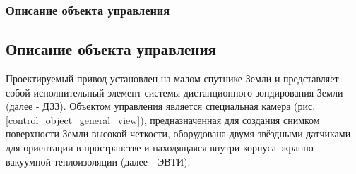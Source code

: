 \ifdefined\DIPLOMA
    \subsubsection{Описание объекта управления}
    \label{sec_controlled_object_desc}
\else
    \subsection{Описание объекта управления}
\fi

Проектируемый привод установлен на малом спутнике Земли и представляет собой
исполнительный элемент системы дистанционного зондирования Земли (далее - ДЗЗ).
Объектом управления является специальная камера (рис. \ref{control_object_general_view}),
предназначенная для создания снимком поверхности Земли высокой четкости,
оборудована двумя звёздными датчиками для ориентации в пространстве и
находящаяся внутри корпуса экранно-вакуумной теплоизоляции (далее - ЭВТИ).

